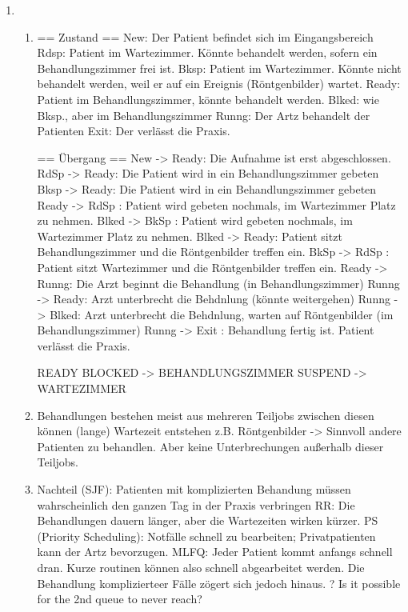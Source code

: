\begin{enumerate}[label={T\arabic*},start=18]
	\item 
		\begin{enumerate}
			\item
				== Zustand ==
				New:	Der Patient befindet sich im Eingangsbereich
				Rdsp:	Patient im Wartezimmer. Könnte behandelt werden, sofern ein Behandlungszimmer frei ist. 
				Bksp:	Patient im Wartezimmer. Könnte nicht behandelt werden, weil er auf ein Ereignis (Röntgenbilder) wartet.
				Ready:	Patient im Behandlungszimmer, könnte behandelt werden.
				Blked:	wie Bksp., aber im Behandlungszimmer
				Runng:	Der Artz behandelt der Patienten
				Exit:	Der verlässt die Praxis.

				== Übergang ==
				New   -> Ready: Die Aufnahme ist erst abgeschlossen.
				RdSp  -> Ready: Die Patient wird in ein Behandlungszimmer gebeten
				Bksp  -> Ready: Die Patient wird in ein Behandlungszimmer gebeten
				Ready -> RdSp : Patient wird gebeten nochmals, im Wartezimmer Platz zu nehmen. 
				Blked -> BkSp : Patient wird gebeten nochmals, im Wartezimmer Platz zu nehmen. 
				Blked -> Ready: Patient sitzt Behandlungszimmer und die Röntgenbilder treffen ein.
				BkSp  -> RdSp : Patient sitzt Wartezimmer und die Röntgenbilder treffen ein.
				Ready -> Runng: Die Arzt beginnt die Behandlung (in Behandlungszimmer)
				Runng -> Ready: Arzt unterbrecht die Behdnlung (könnte weitergehen)
				Runng -> Blked: Arzt unterbrecht die Behdnlung, warten auf Röntgenbilder (im Behandlungszimmer)
				Runng -> Exit : Behandlung fertig ist. Patient verlässt die Praxis.

				READY BLOCKED -> BEHANDLUNGSZIMMER
				SUSPEND -> WARTEZIMMER

			\item Behandlungen bestehen meist aus mehreren Teiljobs zwischen diesen können (lange) Wartezeit entstehen z.B. Röntgenbilder
				-> Sinnvoll andere Patienten zu behandlen.
				Aber keine Unterbrechungen außerhalb dieser Teiljobs.

			\item 
				Nachteil (SJF): Patienten mit komplizierten Behandung müssen wahrscheinlich den ganzen Tag in der Praxis verbringen
				RR: Die Behandlungen dauern länger, aber die Wartezeiten wirken kürzer. 
				PS (Priority Scheduling): Notfälle schnell zu bearbeiten; Privatpatienten kann der Artz bevorzugen.
				MLFQ: Jeder Patient kommt anfangs schnell dran. Kurze routinen können also schnell abgearbeitet werden. Die Behandlung komplizierteer Fälle zögert sich jedoch hinaus.  
					? Is it possible for the 2nd queue to never reach?


\end{enumerate}
\end{enumerate}
